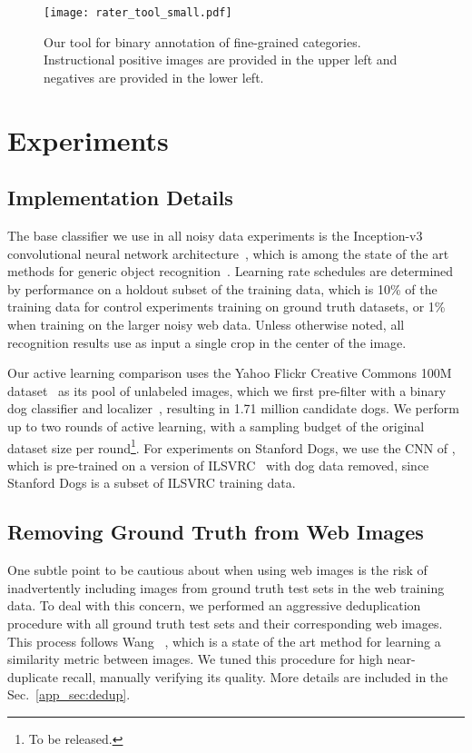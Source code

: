 \documentclass[runningheads]{llncs}
\begin{document}
\begin{SCfigure}[][t]
{
\texttt{[image: rater\_tool\_small.pdf]}
}
{
\caption{
Our tool for binary annotation of fine-grained categories.
Instructional positive images are provided in the upper left and negatives are provided in the lower left.
}
}
\label{fig:rater-tool}
\end{SCfigure}

\section{Experiments}
\label{sec:experiments}

\subsection{Implementation Details}
The base classifier we use in all noisy data experiments is the Inception-v3 convolutional neural network architecture~\cite{szegedy2015rethinking}, which is among the state of the art methods for generic object recognition~\cite{russakovsky2015ilsvrc,szegedy2016inception,he2015deep}.
Learning rate schedules are determined by performance on a holdout subset of the training data, which is 10\% of the training data for control experiments training on ground truth datasets, or 1\% when training on the larger noisy web data.
Unless otherwise noted, all recognition results use as input a single crop in the center of the image.

Our active learning comparison uses the Yahoo Flickr Creative Commons 100M dataset~\cite{thomee2015yfcc100m} as its pool of unlabeled images, which we first pre-filter with a binary dog classifier and localizer~\cite{szegedy2014going}, resulting in 1.71 million candidate dogs.
We perform up to two rounds of active learning, with a sampling budget  of  the original dataset size per round\footnote{To be released.}.
For experiments on Stanford Dogs, we use the CNN of \cite{ioffe2015batch}, which is pre-trained on a version of ILSVRC~\cite{russakovsky2015ilsvrc,imagenet} with dog data removed, since Stanford Dogs is a subset of ILSVRC training data.

\subsection{Removing Ground Truth from Web Images}
One subtle point to be cautious about when using web images is the risk of inadvertently including images from ground truth test sets in the web training data.
To deal with this concern, we performed an aggressive deduplication procedure with all ground truth test sets and their corresponding web images.
This process follows Wang \etal~\cite{wang2014learning}, which is a state of the art method for learning a similarity metric between images.
We tuned this procedure for high near-duplicate recall, manually verifying its quality.
More details are included in the Sec.~\ref{app_sec:dedup}.
\end{document}
